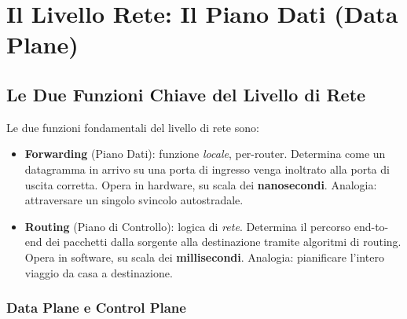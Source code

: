 \chapter{Il Livello Rete: Il Piano Dati (Data Plane)}


\section{Le Due Funzioni Chiave del Livello di Rete}

Le due funzioni fondamentali del livello di rete sono:

\begin{itemize}
    \item \textbf{Forwarding} (Piano Dati): funzione \textit{locale}, per-router. Determina come un datagramma in arrivo su una porta di ingresso venga inoltrato alla porta di uscita corretta. Opera in hardware, su scala dei \textbf{nanosecondi}. Analogia: attraversare un singolo svincolo autostradale.
    \item \textbf{Routing} (Piano di Controllo): logica di \textit{rete}. Determina il percorso end-to-end dei pacchetti dalla sorgente alla destinazione tramite algoritmi di routing. Opera in software, su scala dei \textbf{millisecondi}. Analogia: pianificare l'intero viaggio da casa a destinazione.
\end{itemize}

\subsection{Data Plane e Control Plane}


